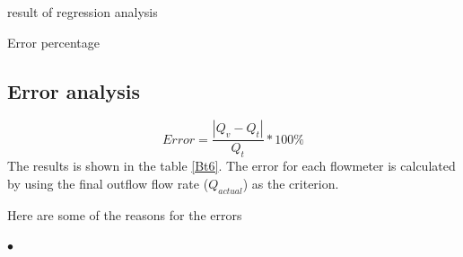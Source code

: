 \begin{minipage}[h]{\textwidth}
  \begin{minipage}[h]{0.49\textwidth}
    \makeatletter{}
    \centering
    \caption{result of regression analysis}
    \label{Bt5} 
  \end{minipage}
  \begin{minipage}{0.49\textwidth}
    \makeatletter{}
    \centering
    \caption{Error percentage}
    \label{Bt6}
  \end{minipage}  
\end{minipage}


\subsection{Error analysis}
\begin{equation}
    Error=\frac{|Q_v-Q_t|}{Q_t}*100\%
    \label{Be9}
\end{equation}
The results is shown in the table \ref{Bt6}.
The error for each flowmeter is calculated 
by using the final outflow flow rate ($Q_{actual}$) as the criterion.

Here are some of the reasons for the errors

$\bullet$  